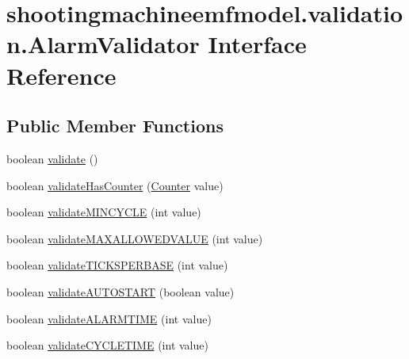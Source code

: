 \hypertarget{interfaceshootingmachineemfmodel_1_1validation_1_1_alarm_validator}{\section{shootingmachineemfmodel.\-validation.\-Alarm\-Validator Interface Reference}
\label{interfaceshootingmachineemfmodel_1_1validation_1_1_alarm_validator}
}
\subsection*{Public Member Functions}
\begin{DoxyCompactItemize}
\item 
boolean \hyperlink{interfaceshootingmachineemfmodel_1_1validation_1_1_alarm_validator_a17e1f2b333fba9691b6b97cd1c060296}{validate} ()
\item 
boolean \hyperlink{interfaceshootingmachineemfmodel_1_1validation_1_1_alarm_validator_ab7a5e7ccd187cd3aa35728e64f94ff0f}{validate\-Has\-Counter} (\hyperlink{interfaceshootingmachineemfmodel_1_1_counter}{Counter} value)
\item 
boolean \hyperlink{interfaceshootingmachineemfmodel_1_1validation_1_1_alarm_validator_a79b4e505d213eac58f444b269c638773}{validate\-M\-I\-N\-C\-Y\-C\-L\-E} (int value)
\item 
boolean \hyperlink{interfaceshootingmachineemfmodel_1_1validation_1_1_alarm_validator_a121bdbc23d7410fd9b3ab03d6d18c5be}{validate\-M\-A\-X\-A\-L\-L\-O\-W\-E\-D\-V\-A\-L\-U\-E} (int value)
\item 
boolean \hyperlink{interfaceshootingmachineemfmodel_1_1validation_1_1_alarm_validator_a3ec948102957a157216f89f7b1633b61}{validate\-T\-I\-C\-K\-S\-P\-E\-R\-B\-A\-S\-E} (int value)
\item 
boolean \hyperlink{interfaceshootingmachineemfmodel_1_1validation_1_1_alarm_validator_a98e63520090198eebd497f35941a3273}{validate\-A\-U\-T\-O\-S\-T\-A\-R\-T} (boolean value)
\item 
boolean \hyperlink{interfaceshootingmachineemfmodel_1_1validation_1_1_alarm_validator_aa417eeec75ddc292b7bc804f732cdc1f}{validate\-A\-L\-A\-R\-M\-T\-I\-M\-E} (int value)
\item 
boolean \hyperlink{interfaceshootingmachineemfmodel_1_1validation_1_1_alarm_validator_a5e99c7c9b17090c1272ca87c253b992e}{validate\-C\-Y\-C\-L\-E\-T\-I\-M\-E} (int value)
\end{DoxyCompactItemize}



